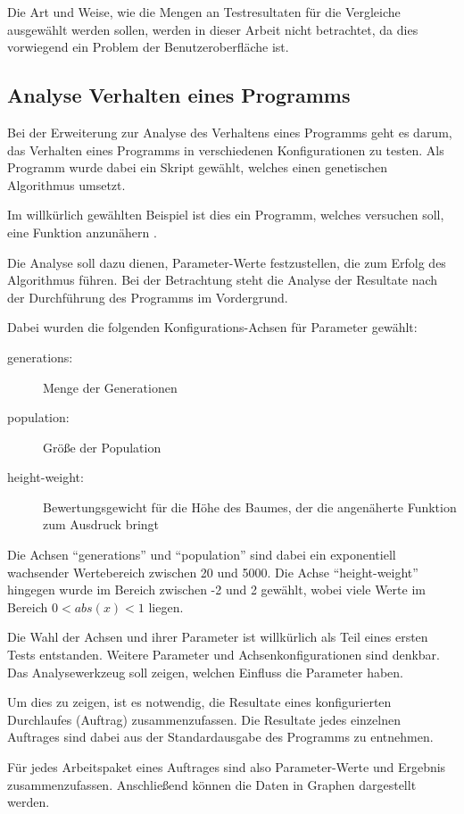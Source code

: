 Die Art und Weise, wie die Mengen an Testresultaten für die Vergleiche ausgewählt werden sollen, werden in dieser Arbeit nicht betrachtet,
da dies vorwiegend ein Problem der Benutzeroberfläche ist.

\subsection{Analyse Verhalten eines Programms}

Bei der Erweiterung zur Analyse des Verhaltens eines Programms
geht es darum, das Verhalten eines Programms
in verschiedenen Konfigurationen zu testen.
Als Programm wurde dabei ein Skript gewählt,
welches einen genetischen Algorithmus umsetzt.

Im willkürlich gewählten Beispiel ist dies ein Programm,
welches versuchen soll, eine Funktion anzunähern \cite{gen:prog}.

Die Analyse soll dazu dienen, Parameter-Werte festzustellen,
die zum Erfolg des Algorithmus führen.
Bei der Betrachtung steht die Analyse der Resultate nach der Durchführung des Programms im Vordergrund.

Dabei wurden die folgenden Konfigurations-Achsen für Parameter gewählt:

\begin{description}
    \item[generations:] Menge der Generationen
    \item[population:] Größe der Population
    \item[height-weight:] Bewertungsgewicht für die Höhe des Baumes, der die angenäherte Funktion zum Ausdruck bringt
\end{description}

Die Achsen ``generations'' und ``population'' sind dabei ein exponentiell wachsender Wertebereich zwischen 20 und 5000.
Die Achse ``height-weight'' hingegen wurde im Bereich zwischen -2 und 2 gewählt,
wobei viele Werte im Bereich $ 0<abs(x)<1$ liegen.

Die Wahl der Achsen und ihrer Parameter ist willkürlich als Teil eines ersten Tests entstanden.
Weitere Parameter und Achsenkonfigurationen sind denkbar.
Das Analysewerkzeug soll zeigen, welchen Einfluss die Parameter haben.

Um dies zu zeigen, ist es notwendig, die Resultate
eines konfigurierten Durchlaufes (Auftrag) zusammenzufassen.
Die Resultate jedes einzelnen Auftrages sind dabei aus der Standardausgabe
des Programms zu entnehmen.

Für jedes Arbeitspaket eines Auftrages sind also Parameter-Werte und Ergebnis zusammenzufassen.
Anschließend können die Daten in Graphen dargestellt werden.


